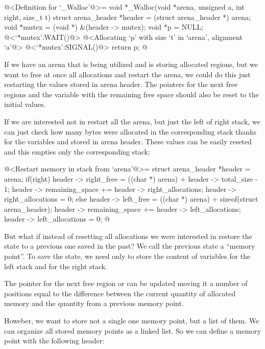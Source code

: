 \iniciocodigo
@<Definition for `\_Walloc'@>=
void *_Walloc(void *arena, unsigned a, int right, size_t t){
  struct arena_header *header = (struct arena_header *) arena;
  void *mutex = (void *) &(header -> mutex);
  void *p = NULL;
  @<`*mutex':WAIT()@>
  @<Allocating `p' with size `t' in `arena', alignment `a'@>
  @<`*mutex':SIGNAL()@>
  return p;
}
@
\fimcodigo


If we have an arena that is being utilized and is storing allocated
regions, but we want to free at once all allocations and restart the
arena, we could do this just restarting the values stored in arena
header. The pointers for the next free regions and the variable with
the remaining free space should also be reset to the initial values.

If we are interested not in restart all the arena, but just the left
of right stack, we can just check how many bytes were allocated in the
corresponding stack thanks for the
variables 
and  stored in arena header. These
values can be easily reseted and this empties only the corresponding
stack:


\iniciocodigo
@<Restart memory in stack from `arena'@>=
{
  struct arena_header *header = arena;
  if(right){
    header -> right_free = ((char *) arena) + header -> total_size - 1;
    header -> remaining_space += header -> right_allocations;
    header -> right_allocations = 0;
  }
  else{
    header -> left_free = ((char *) arena) + sizeof(struct arena_header);
    header -> remaining_space += header -> left_allocations;
    header -> left_allocations = 0;
  }
}
@
\fimcodigo

But what if instead of resetting all allocations we were interested in
restore the state to a previous one saved in the past? We call the
previous state a ``memory point''. To save the state, we need only to
store the content of variables  for the
left stack and  for the right stack.

The pointer for the next free region 
or  can be updated moving it a number of
positions equal to the difference between the current quantity of
allocated memory and the quantity from a previous memory point.

Howeber, we want to store not a single one memory point, but a list of
them. We can organize all stored memory points as a linked list. So we
can define a memory point with the following header:

